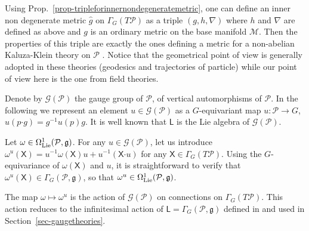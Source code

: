 \documentclass[number]{elsarticle}
\theoremstyle{definition}
\theoremstyle{remark}
\numberwithin{equation}{section}
\begin{document}
Using Prop.~\ref{prop-tripleforinnernondegeneratemetric}, one can define an inner non degenerate metric ${{\widehat{g}}}$ on $\Gamma_G(T{{{{\mathcal{{P}}}}}})$ as a triple $(g, h, \nabla)$ where $h$ and $\nabla$ are defined as above and $g$ is an ordinary metric on the base manifold ${{{{\mathcal{{M}}}}}}$. Then the properties of this triple are exactly the ones defining a metric for a non-abelian Kaluza-Klein theory on ${{{{\mathcal{{P}}}}}}$ \cite{Kerner1988fn}. Notice that the geometrical point of view is generally adopted in these theories (geodesics and trajectories of particle) while our point of view here is the one from field theories.

\medskip
Denote by ${{\mathcal G}}({{{{\mathcal{{P}}}}}})$ the gauge group of ${{{{\mathcal{{P}}}}}}$, of vertical automorphisms of ${{{{\mathcal{{P}}}}}}$. In the following we represent an element $u \in {{\mathcal G}}({{{{\mathcal{{P}}}}}})$ as a $G$-equivariant map $u : {{{{\mathcal{{P}}}}}} \rightarrow G$, $u(p{\mathord{\cdot}} g) = g^{-1} u(p) g$. It is well known that ${{{{\mathbf{\mathsf{{L}}}}}}}$ is the Lie algebra of ${{\mathcal G}}({{{{\mathcal{{P}}}}}})$. 

Let $\omega \in \Omega^1_{{\text{\textup{Lie}}}}({{{{\mathcal{{P}}}}}}, {{\mathfrak g}})$. For any $u \in {{\mathcal G}}({{{{\mathcal{{P}}}}}})$, let us introduce $\omega^u({{\mathsf X}}) = u^{-1} \omega({{\mathsf X}}) u + u^{-1} ({{\mathsf X}} {\mathord{\cdot}} u)$ for any ${{\mathsf X}} \in \Gamma_G(T{{{{\mathcal{{P}}}}}})$. Using the $G$-equivariance of $\omega({{\mathsf X}})$ and $u$, it is straightforward to verify that $\omega^u({{\mathsf X}}) \in \Gamma_G({{{{\mathcal{{P}}}}}}, {{\mathfrak g}})$, so that $\omega^u \in \Omega^1_{{\text{\textup{Lie}}}}({{{{\mathcal{{P}}}}}}, {{\mathfrak g}})$.

The map $\omega \mapsto \omega^u$ is the action of ${{\mathcal G}}({{{{\mathcal{{P}}}}}})$ on connections on $\Gamma_G(T{{{{\mathcal{{P}}}}}})$. This action reduces to the infinitesimal action of ${{{{\mathbf{\mathsf{{L}}}}}}} = \Gamma_G({{{{\mathcal{{P}}}}}}, {{\mathfrak g}})$ defined in \cite{Mass38} and used in Section~\ref{sec-gaugetheories}.
\end{document}
